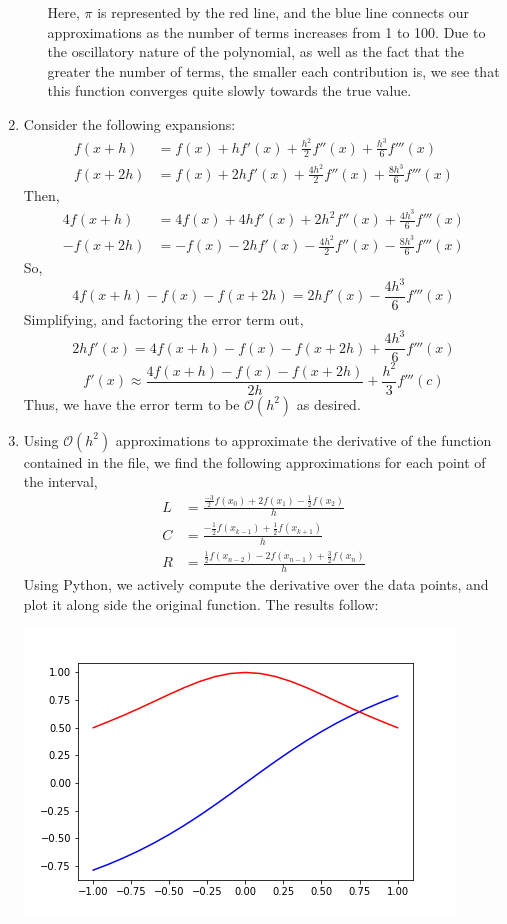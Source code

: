 \documentclass[letterpaper,10pt]{article}
\begin{document}
\begin{enumerate}
\begin{enumerate}
\begin{center}
\end{center}
Here, $\pi$ is represented by the red line, and the blue line connects our approximations as the number of terms increases from 1 to 100. Due to the oscillatory nature of the polynomial, as well as the fact that the greater the number of terms, the smaller each contribution is, we see that this function converges quite slowly towards the true value.
\end{enumerate}
\item Consider the following expansions:
\begin{align*}
f(x+h) &= f(x)+hf'(x)+\frac{h^2}{2}f''(x)+\frac{h^3}{6}f'''(x)\\
f(x+2h) &= f(x)+2hf'(x)+\frac{4h^2}{2}f''(x)+\frac{8h^3}{6}f'''(x)
\end{align*}
Then,
\begin{align*}
4f(x+h)&=4f(x)+4hf'(x)+2h^2f''(x)+\frac{4h^3}{6}f'''(x)\\
-f(x+2h) &= -f(x)-2hf'(x)-\frac{4h^2}{2}f''(x)-\frac{8h^3}{6}f'''(x)
\end{align*}
So,
\[4f(x+h)-f(x)-f(x+2h) = 2hf'(x)-\frac{4h^3}{6}f'''(x)\]
Simplifying, and factoring the error term out,
\[2hf'(x)=4f(x+h)-f(x)-f(x+2h)+\frac{4h^3}{6}f'''(x)\]
\[f'(x)\approx \frac{4f(x+h)-f(x)-f(x+2h)}{2h}+\frac{h^2}{3}f'''(c)\]
Thus, we have the error term to be $\mathcal{O}(h^2)$ as desired.
\item Using $\mathcal{O}(h^2)$ approximations to approximate the derivative of the function contained in the file, we find the following approximations for each point of the interval,
\begin{align*}
L &= \frac{\frac{-3}{2}f(x_0)+2f(x_1)-\frac{1}{2}f(x_2)}{h}\\
C &= \frac{-\frac{1}{2}f(x_{k-1})+\frac{1}{2}f(x_{k+1})}{h}\\
R &= \frac{\frac{1}{2}f(x_{n-2})-2f(x_{n-1})+\frac{3}{2}f(x_n)}{h}
\end{align*}
Using Python, we actively compute the derivative over the data points, and plot it along side the original function. The results follow:
\begin{center}
\includegraphics[scale=.75]{5.png}

\end{center}
\end{enumerate}
\end{document}
